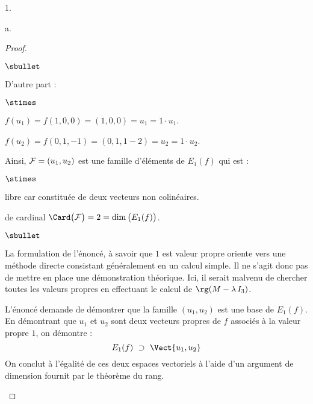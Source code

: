 \documentclass[11pt]{article}%
\begin{document}
\begin{noliste}{1.}
\begin{noliste}{a.}
\begin{proof}
\begin{noliste}{$\sbullet$}
      \item D'autre part :
        \begin{noliste}{$\stimes$}
        \item $f(u_1) = f(1, 0, 0) = (1, 0, 0) = u_1 = 1 \cdot u_1$.
        \item $f(u_2) = f(0, 1, -1) = (0, 1, 1-2) = u_2 = 1 \cdot u_2$.
        \end{noliste}

      \item Ainsi, ${\cal F} = (u_1, u_2)$ est une famille d'éléments
        de $E_1(f)$ qui est :
        \begin{noliste}{$\stimes$}
        \item libre car constituée de deux vecteurs non colinéaires.
        \item de cardinal $\Card\big( {\cal F} \big) = 2 = \dim\big(
          E_1(f) \big)$. %
        \end{noliste}
      \end{noliste}
      \begin{remarkL}{.98}%
        \begin{noliste}{$\sbullet$}
        \item La formulation de l'énoncé, à savoir 
          que $1$ est valeur propre \fg{} oriente vers une méthode
          directe consistant généralement en un calcul simple. Il ne
          s'agit donc pas de mettre en place une démonstration
          théorique. Ici, il serait malvenu de chercher toutes les
          valeurs propres en effectuant le calcul de $\rg(M - \lambda
          \, I_3)$.
        \item L'énoncé demande de démontrer que la famille $(u_1, u_2)$
          est une base de $E_1(f)$.\\
          En démontrant que $u_1$ et $u_2$ sont deux vecteurs propres de
          $f$ associés à la valeur propre $1$, on démontre :
          \[
          E_1(f) \ \supset \ \Vect{u_1, u_2}
          \]
          On conclut à l'égalité de ces deux espaces vectoriels à l'aide
          d'un argument de dimension fournit par le théorème du rang.
          

\end{noliste}
\end{remarkL}
\end{proof}
\end{noliste}
\end{noliste}
\end{document}
